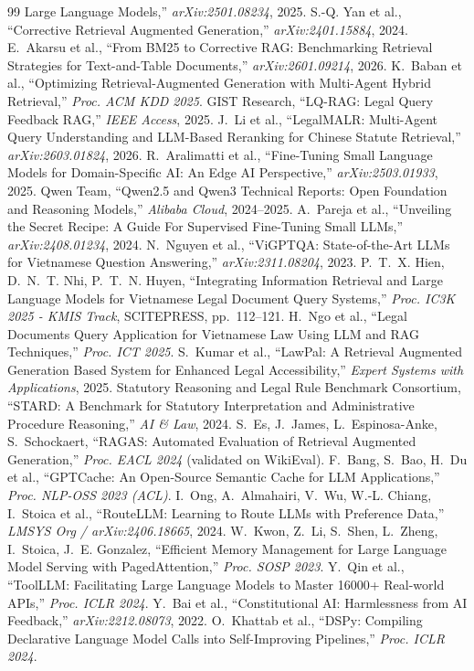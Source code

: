\documentclass[11pt,a4paper]{article}
\begin{document}
\begin{thebibliography}{99}
Large Language Models,'' \textit{arXiv:2501.08234}, 2025.
 S.-Q. Yan et al., ``Corrective Retrieval Augmented Generation,'' \textit{arXiv:2401.15884},
2024.
 E.~Akarsu et al., ``From BM25 to Corrective RAG: Benchmarking Retrieval Strategies for
Text-and-Table Documents,'' \textit{arXiv:2601.09214}, 2026.
 K.~Baban et al., ``Optimizing Retrieval-Augmented Generation with Multi-Agent Hybrid
Retrieval,'' \textit{Proc. ACM KDD 2025}.
 GIST Research, ``LQ-RAG: Legal Query Feedback RAG,'' \textit{IEEE Access}, 2025.
 J.~Li et al., ``LegalMALR: Multi-Agent Query Understanding and LLM-Based Reranking for
Chinese Statute Retrieval,'' \textit{arXiv:2603.01824}, 2026.
 R.~Aralimatti et al., ``Fine-Tuning Small Language Models for Domain-Specific AI: An Edge
AI Perspective,'' \textit{arXiv:2503.01933}, 2025.
 Qwen Team, ``Qwen2.5 and Qwen3 Technical Reports: Open Foundation and Reasoning Models,''
\textit{Alibaba Cloud}, 2024--2025.
 A.~Pareja et al., ``Unveiling the Secret Recipe: A Guide For Supervised Fine-Tuning Small
LLMs,'' \textit{arXiv:2408.01234}, 2024.
 N.~Nguyen et al., ``ViGPTQA: State-of-the-Art LLMs for Vietnamese Question Answering,''
\textit{arXiv:2311.08204}, 2023.
 P.~T.~X. Hien, D.~N.~T. Nhi, P.~T.~N. Huyen, ``Integrating Information Retrieval and Large
Language Models for Vietnamese Legal Document Query Systems,'' \textit{Proc. IC3K 2025 - KMIS Track},
SCITEPRESS, pp.~112--121.
 H.~Ngo et al., ``Legal Documents Query Application for Vietnamese Law Using LLM and RAG
Techniques,'' \textit{Proc. ICT 2025}.
 S.~Kumar et al., ``LawPal: A Retrieval Augmented Generation Based System for Enhanced
Legal Accessibility,'' \textit{Expert Systems with Applications}, 2025.
 Statutory Reasoning and Legal Rule Benchmark Consortium, ``STARD: A Benchmark for
Statutory Interpretation and Administrative Procedure Reasoning,'' \textit{AI \& Law}, 2024.
 S.~Es, J.~James, L.~Espinosa-Anke, S.~Schockaert, ``RAGAS: Automated Evaluation of
Retrieval Augmented Generation,'' \textit{Proc. EACL 2024} (validated on WikiEval).
 F.~Bang, S.~Bao, H.~Du et al., ``GPTCache: An Open-Source Semantic Cache for LLM
Applications,'' \textit{Proc. NLP-OSS 2023 (ACL)}.
 I.~Ong, A.~Almahairi, V.~Wu, W.-L. Chiang, I.~Stoica et al., ``RouteLLM: Learning to
Route LLMs with Preference Data,'' \textit{LMSYS Org / arXiv:2406.18665}, 2024.
 W.~Kwon, Z.~Li, S.~Shen, L.~Zheng, I.~Stoica, J.~E. Gonzalez, ``Efficient Memory Management
for Large Language Model Serving with PagedAttention,'' \textit{Proc. SOSP 2023}.
 Y.~Qin et al., ``ToolLLM: Facilitating Large Language Models to Master 16000+ Real-world
APIs,'' \textit{Proc. ICLR 2024}.
 Y.~Bai et al., ``Constitutional AI: Harmlessness from AI Feedback,''
\textit{arXiv:2212.08073}, 2022.
 O.~Khattab et al., ``DSPy: Compiling Declarative Language Model Calls into Self-Improving
Pipelines,'' \textit{Proc. ICLR 2024}.
\end{thebibliography}
\end{document}
